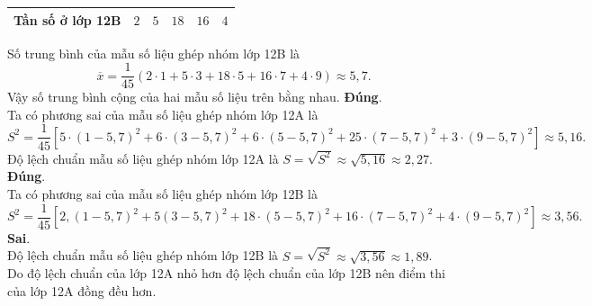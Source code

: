 \begin{ex}
{\begin{itemchoice}
\begin{center}
\begin{tabular}{|c|c|c|c|c|c|}
						Tần số ở lớp 12B&$2$&$5$&$18$&$16$&$4$\\
						\hline			
					\end{tabular}
				\end{center}
				Số trung bình của mẫu số liệu ghép nhóm lớp 12B là				
				\[\overline{x}=\dfrac{1}{45}\left(2\cdot 1+5\cdot 3+18\cdot 5+16\cdot 7+4\cdot 9 \right)
				\approx 5{,}7.\]
				Vậy số trung bình cộng của hai mẫu số liệu trên bằng nhau.
				\itemch \textbf{Đúng}.\\
				Ta có phương sai của mẫu số liệu ghép nhóm lớp 12A là\\
				\[S^2=\dfrac{1}{45}\left[ 
				  5\cdot (1-5{,}7)^2
				+ 6\cdot (3-5{,}7)^2
				+ 6\cdot (5-5{,}7)^2
				+25\cdot (7-5{,}7)^2
				+ 3\cdot (9-5{,}7)^2 \right]
				\approx 5{,}16.\]
				Độ lệch chuẩn mẫu số liệu ghép nhóm lớp 12A là $S=\sqrt{S^2}\approx \sqrt{5{,}16}\approx 2{,}27$.
				\itemch \textbf{Đúng}.\\
				Ta có phương sai của mẫu số liệu ghép nhóm lớp 12B là
				\[S^2=\dfrac{1}{45}\left[ 2{,}(1-5{,}7)^2+5(3-5{,}7)^2+18\cdot (5-5{,}7)^2+16\cdot (7-5{,}7)^2+4\cdot (9-5{,}7)^2 \right]\approx 3{,}56.\]
				\itemch \textbf{Sai}.\\
				Độ lệch chuẩn mẫu số liệu ghép nhóm lớp 12B là $S=\sqrt{S^2}\approx \sqrt{3{,}56}\approx 1{,}89$.\\
				Do độ lệch chuẩn của lớp 12A nhỏ hơn độ lệch chuẩn của lớp 12B nên điểm thi của lớp 12A đồng đều hơn.
			\end{itemchoice}
}
\end{ex}

